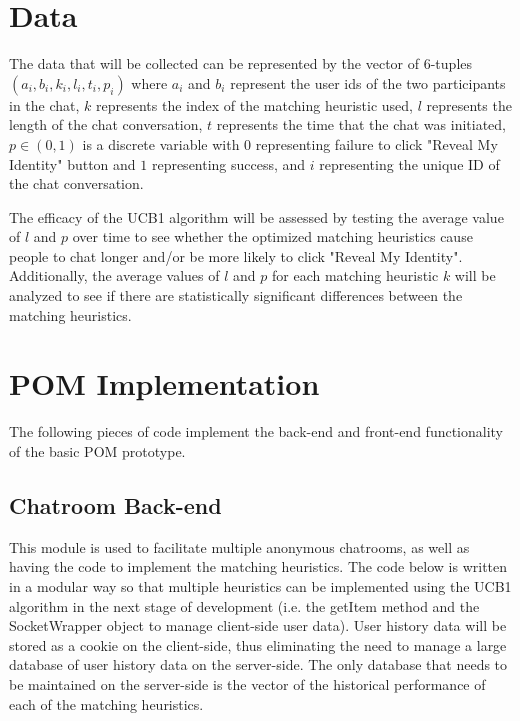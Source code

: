 \documentclass{article}
\begin{document}
\section{Data}

The data that will be collected can be represented by the vector of 6-tuples $(a_i, b_i, k_i, l_i, t_i, p_i)$ where $a_i$ and $b_i$ represent the user ids of the two participants in the chat, $k$ represents the index of the matching heuristic used, $l$ represents the length of the chat conversation, $t$ represents the time that the chat was initiated, $p \in{(0, 1)} $ is a discrete variable with $0$ representing failure to click "Reveal My Identity" button and $1$ representing success, and $i$ representing the unique ID of the chat conversation.

The efficacy of the UCB1 algorithm will be assessed by testing the average value of $l$ and $p$ over time to see whether the optimized matching heuristics cause people to chat longer and/or be more likely to click "Reveal My Identity". Additionally, the average values of $l$ and $p$ for each matching heuristic $k$ will be analyzed to see if there are statistically significant differences between the matching heuristics.

\section{POM Implementation}

The following pieces of code implement the back-end and front-end functionality of the basic POM prototype. 

\subsection{Chatroom Back-end} 

This module is used to facilitate multiple anonymous chatrooms, as well as having the code to implement the matching heuristics. The code below is written in a modular way so that multiple heuristics can be implemented using the UCB1 algorithm in the next stage of development (i.e. the getItem method and the SocketWrapper object to manage client-side user data). User history data will be stored as a cookie on the client-side, thus eliminating the need to manage a large database of user history data on the server-side. The only database that needs to be maintained on the server-side is the vector of the historical performance of each of the matching heuristics.
\end{document}
